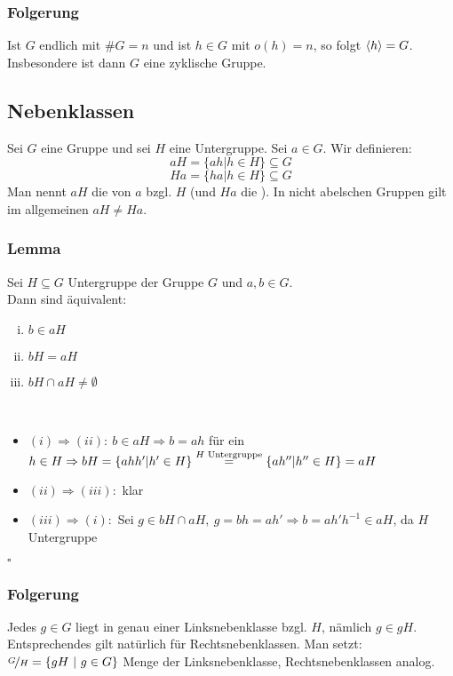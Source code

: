 \subsubsection*{Folgerung}
Ist $G$ endlich mit $\#G=n$ und ist $h\in G$ mit $o(h)=n$, so folgt $\langle h \rangle=G$. Insbesondere ist dann $G$ eine zyklische Gruppe.

\subsection{Nebenklassen}
\label{sub:nebenklassen}
 

Sei $G$ eine Gruppe und sei $H$ eine Untergruppe. Sei $a\in G$. Wir definieren:
\[aH=\{ah | h\in H\}\subseteq G\]
\[Ha=\{ha | h\in H\}\subseteq G\]
Man nennt $aH$ die  von $a$ bzgl. $H$ (und $Ha$ die ). In nicht abelschen Gruppen gilt im allgemeinen $aH\not=Ha$.

\subsubsection*{Lemma}
Sei $H\subseteq G$ Untergruppe der Gruppe $G$ und $a,b\in G$.\\
Dann sind äquivalent:
\begin{enumerate}[(i)]
	\item $b\in aH$
	\item $bH=aH$
	\item $bH \cap aH \not= \emptyset$
\end{enumerate}
\\
\begin{itemize}
	\item$(i)\Rightarrow (ii):~b\in aH \Rightarrow b=ah$ für ein $h\in H \Rightarrow bH=\{ahh' | h' \in H\}\\
	\stackrel{H\text{ Untergruppe}}{=}\{ah'' | h''\in H\}=aH$
	\item$(ii) \Rightarrow (iii):$ klar
	\item$(iii) \Rightarrow (i):$ Sei $g \in bH \cap aH,~g=bh=ah' \Rightarrow b=ah'h^{-1} \in aH$, da $H$ Untergruppe
\end{itemize}
\hfill $\square$

\subsubsection*{Folgerung}
Jedes $g\in G$ liegt in genau einer Linksnebenklasse bzgl. $H$, nämlich $g \in gH$.
Entsprechendes gilt natürlich für Rechtsnebenklassen. Man setzt:\\
$\nicefrac{G}{H}=\{gH~|~g \in G \}$ Menge der Linksnebenklasse, Rechtsnebenklassen analog.

